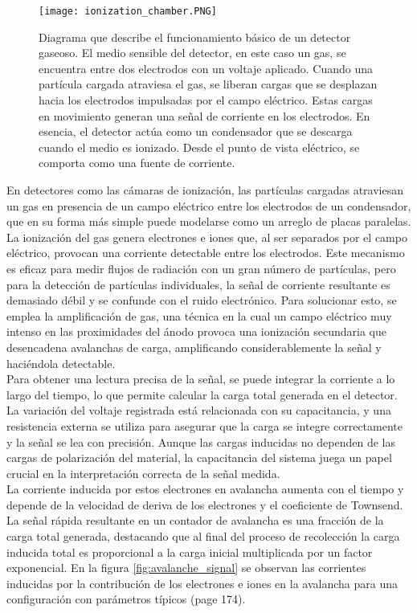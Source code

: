 \documentclass[]{book}
\begin{document}
\begin{figure}[H]
    \centering
    \texttt{[image: ionization\_chamber.PNG]}
    \caption{Diagrama que describe el funcionamiento básico de un detector gaseoso. El medio sensible del detector, en este caso un gas, se encuentra entre dos electrodos con un voltaje aplicado. Cuando una partícula cargada atraviesa el gas, se liberan cargas que se desplazan hacia los electrodos impulsadas por el campo eléctrico. Estas cargas en movimiento generan una señal de corriente en los electrodos. En esencia, el detector actúa como un condensador que se descarga cuando el medio es ionizado. Desde el punto de vista eléctrico, se comporta como una fuente de corriente.}
    \label{fig:ionization_chamber}
\end{figure}

\noindent En detectores como las cámaras de ionización, las partículas cargadas atraviesan un gas en presencia de un campo eléctrico entre los electrodos de un condensador, que en su forma más simple puede modelarse como un arreglo de placas paralelas. La ionización del gas genera electrones e iones que, al ser separados por el campo eléctrico, provocan una corriente detectable entre los electrodos. Este mecanismo es eficaz para medir flujos de radiación con un gran número de partículas, pero para la detección de partículas individuales, la señal de corriente resultante es demasiado débil y se confunde con el ruido electrónico. Para solucionar esto, se emplea la amplificación de gas, una técnica en la cual un campo eléctrico muy intenso en las proximidades del ánodo provoca una ionización secundaria que desencadena avalanchas de carga, amplificando considerablemente la señal y haciéndola detectable.\\

\noindent Para obtener una lectura precisa de la señal, se puede integrar la corriente a lo largo del tiempo, lo que permite calcular la carga total generada en el detector. La variación del voltaje registrada está relacionada con su capacitancia, y una resistencia externa se utiliza para asegurar que la carga se integre correctamente y la señal se lea con precisión. Aunque las cargas inducidas no dependen de las cargas de polarización del material, la capacitancia del sistema juega un papel crucial en la interpretación correcta de la señal medida.\\

\noindent La corriente inducida por estos electrones en avalancha aumenta con el tiempo y depende de la velocidad de deriva de los electrones y el coeficiente de Townsend. La señal rápida resultante en un contador de avalancha es una fracción de la carga total generada, destacando que al final del proceso de recolección la carga inducida total es proporcional a la carga inicial multiplicada por un factor exponencial. En la figura \ref{fig:avalanche_signal} se observan las corrientes inducidas por la contribución de los electrones e iones en la avalancha para una configuración con parámetros típicos (page 174).
\end{document}
